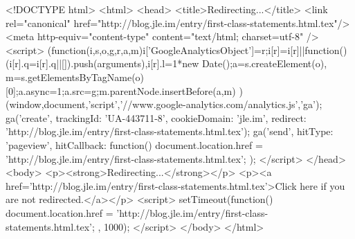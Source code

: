 <!DOCTYPE html>
<html>
<head>
<title>Redirecting...</title>
<link rel="canonical" href="http://blog.jle.im/entry/first-class-statements.html.tex"/>
<meta http-equiv="content-type" content="text/html; charset=utf-8" />
<script>
(function(i,s,o,g,r,a,m){i['GoogleAnalyticsObject']=r;i[r]=i[r]||function(){
(i[r].q=i[r].q||[]).push(arguments)},i[r].l=1*new Date();a=s.createElement(o),
m=s.getElementsByTagName(o)[0];a.async=1;a.src=g;m.parentNode.insertBefore(a,m)
})(window,document,'script','//www.google-analytics.com/analytics.js','ga');
ga('create', { trackingId: 'UA-443711-8', cookieDomain: 'jle.im', redirect: 'http://blog.jle.im/entry/first-class-statements.html.tex'});
ga('send', { hitType: 'pageview', hitCallback: function() { document.location.href = 'http://blog.jle.im/entry/first-class-statements.html.tex'; } });
</script>
</head>
<body>
  <p><strong>Redirecting...</strong></p>
  <p><a href='http://blog.jle.im/entry/first-class-statements.html.tex'>Click here if you are not redirected.</a></p>
  <script>
    setTimeout(function() { document.location.href = 'http://blog.jle.im/entry/first-class-statements.html.tex'; }, 1000);
  </script>
</body>
</html>
